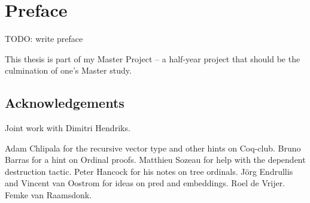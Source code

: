 \chapter*{Preface}
\thispagestyle{empty}

TODO: write preface

This thesis is part of my Master Project -- a half-year project that should be
the culmination of one's Master study.


\section*{Acknowledgements}

Joint work with Dimitri Hendriks.

Adam Chlipala for the recursive vector type and other hints on
Coq-club. Bruno Barras for a hint on Ordinal proofs. Matthieu Sozeau for help
with the dependent destruction tactic. Peter Hancock for his notes on tree
ordinals. J\"org Endrullis and Vincent van Oostrom for ideas on pred and
embeddings. Roel de Vrijer. Femke van Raamsdonk.
